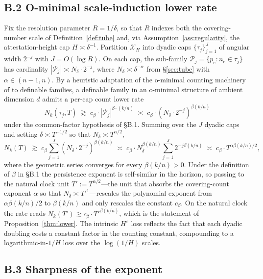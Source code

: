 \documentclass[12pt]{article}
\theoremstyle{sampledef}
\theoremstyle{sampleplain}
\theoremstyle{sampleremark}
\newcommand{\1}{\mathbf{1}}
\begin{document}
\subsection*{B.2 O-minimal scale-induction lower rate}

Fix the resolution parameter $R = 1/\delta$, so that $R$ indexes
both the covering-number scale of Definition~\ref{def:tube} and,
via Assumption~\ref{ass:regularity}, the attestation-height cap
$H \asymp \delta^{-1}$. Partition $\mathcal{X}_H$ into dyadic caps
$\{\tau_j\}_{j=1}^{J}$ of angular width $2^{-j}$ with
$J = O(\log R)$. On each cap, the sub-family
$\mathcal{P}_j = \{p_e : n_e \in \tau_j\}$ has cardinality
$|\mathcal{P}_j| \asymp N_\delta \cdot 2^{-j}$, where
$N_\delta \asymp \delta^{-\alpha}$ from \S\ref{sec:tube} with
$\alpha \in (n-1,n)$. By a heuristic adaptation of the o-minimal counting machinery of
\citet{PilaWilkie2006} to definable families, a definable family in an
o-minimal structure of ambient dimension $d$ admits
a per-cap count lower rate
\[
N_k(\tau_j, T) \;\gtrsim\;
c_\beta \cdot |\mathcal{P}_j|^{\beta \cdot (k/n)}
\;\asymp\;
c_\beta \cdot (N_\delta \cdot 2^{-j})^{\beta(k/n)}
\]
under the common-factor hypothesis of \S B.1. Summing over the
$J$ dyadic caps and setting $\delta \asymp T^{-1/2}$ so that
$N_\delta \asymp T^{\alpha/2}$,
\[
N_k(T) \;\gtrsim\;
c_\beta \sum_{j=1}^{J}
(N_\delta \cdot 2^{-j})^{\beta(k/n)}
\;\asymp\;
c_\beta \cdot N_\delta^{\beta(k/n)}
\sum_{j=1}^{J} 2^{-j\beta(k/n)}
\;\asymp\;
c_\beta \cdot T^{\alpha\beta(k/n)/2},
\]
where the geometric series converges for every $\beta(k/n) > 0$.
Under the definition of $\beta$ in \S B.1 the persistence exponent
is self-similar in the horizon, so passing to the natural clock unit $T' := T^{\alpha/2}$---the
unit that absorbs the covering-count exponent $\alpha$ so that
$N_\delta \asymp T'^{1}$---rescales the polynomial exponent from
$\alpha\beta(k/n)/2$ to $\beta(k/n)$ and only rescales the constant
$c_\beta$.
On the natural clock the rate reads
$N_k(T') \gtrsim c_\beta \cdot T'^{\beta(k/n)}$, which is the
statement of Proposition~\ref{thm:lower}. The intrinsic
$H^\varepsilon$ loss reflects the fact that each dyadic doubling
costs a constant factor in the counting constant, compounding to a
logarithmic-in-$1/H$ loss over the $\log(1/H)$ scales.

\subsection*{B.3 Sharpness of the exponent}
\end{document}
